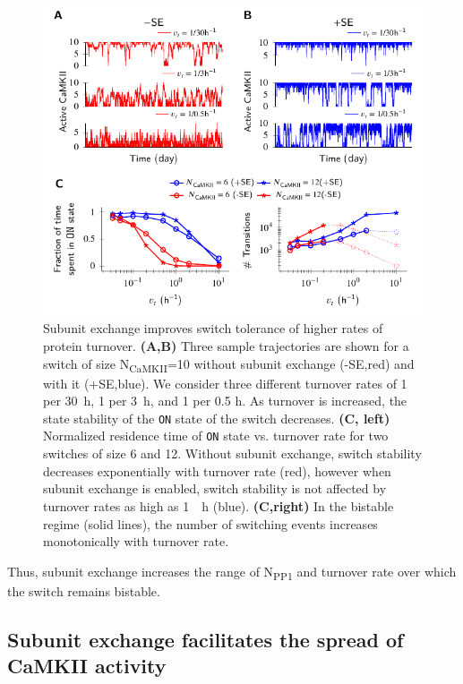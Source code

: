 \documentclass[9pt,lineno,doublespacing]{elife}
\newcommand\SUB[2]{#1\textsubscript{#2}}
\begin{document}
\begin{figure}[th!]
    \includegraphics[width=114mm]{./PaperFigures/elifeFigure3/figure_turnover_tolerance_114.pdf}
    \caption{Subunit exchange improves switch tolerance of higher rates of
        protein turnover.
        \textbf{(A,B)} Three sample trajectories are shown for a switch of 
        size \SUB{N}{CaMKII}=10 without subunit exchange
        (-SE,red) and with it (+SE,blue). We consider three different 
        turnover rates of 1 per \SI{30}{\hour}, 1 per \SI{3}{\hour}, 
        and 1 per 0.5 \si{\hour}. As turnover is increased, the state stability 
        of the \texttt{ON} state of the switch decreases.
        \textbf{(C, left)} Normalized residence time of \texttt{ON} state vs. turnover
        rate for two switches of size 6 and 12. Without subunit exchange, switch
        stability decreases exponentially with turnover rate (red), however when
        subunit exchange is enabled, switch stability is not affected by
        turnover rates as high as \SI{1}{\per \hour} (blue). \textbf{(C,right)} In
        the bistable regime (solid lines), the number of switching events
        increases monotonically with turnover rate.
    }\label{fig:turnover}
\end{figure}

Thus, subunit exchange increases the range of \SUB{N}{PP1} and turnover rate 
over which the switch remains bistable. 

\subsection{Subunit exchange facilitates the spread of CaMKII activity}
\label{res:spread_activity}
\end{document}
